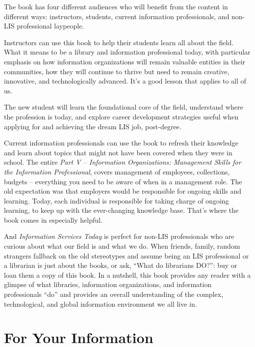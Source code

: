 \documentclass[a4paper,
fontsize=11pt,
oneside,
numbers=noperiodatend,
parskip=half-,
bibliography=totoc,
final
]{scrartcl}
\begin{document}
The book has four different audiences who will benefit from the content
in different ways: instructors, students, current information
professionals, and non-LIS professional laypeople.

Instructors can use this book to help their students learn all about the
field. What it means to be a library and information professional today,
with particular emphasis on how information organizations will remain
valuable entities in their communities, how they will continue to thrive
but need to remain creative, innovative, and technologically advanced.
It's a good lesson that applies to all of us.

The new student will learn the foundational core of the field,
understand where the profession is today, and explore career development
strategies useful when applying for and achieving the dream LIS job,
post-degree.

Current information professionals can use the book to refresh their
knowledge and learn about topics that might not have been covered when
they were in school. The entire \emph{Part V -- Information
Organizations: Management Skills for the Information Professional},
covers management of employees, collections, budgets -- everything you
need to be aware of when in a management role. The old expectation was
that employers would be responsible for ongoing skills and learning.
Today, each individual is responsible for taking charge of ongoing
learning, to keep up with the ever-changing knowledge base. That's where
the book comes in especially helpful.

And \emph{Information Services Today} is perfect for non-LIS
professionals who are curious about what our field is and what we do.
When friends, family, random strangers fallback on the old stereotypes
and assume being an LIS professional or a librarian is just about the
books, or ask, \enquote{What do librarians DO?}: buy or loan them a copy
of this book. In a nutshell, this book provides any reader with a
glimpse of what libraries, information organizations, and information
professionals \enquote{do} and provides an overall understanding of the
complex, technological, and global information environment we all live
in.

\section*{For Your Information}\label{for-your-information}
\end{document}
